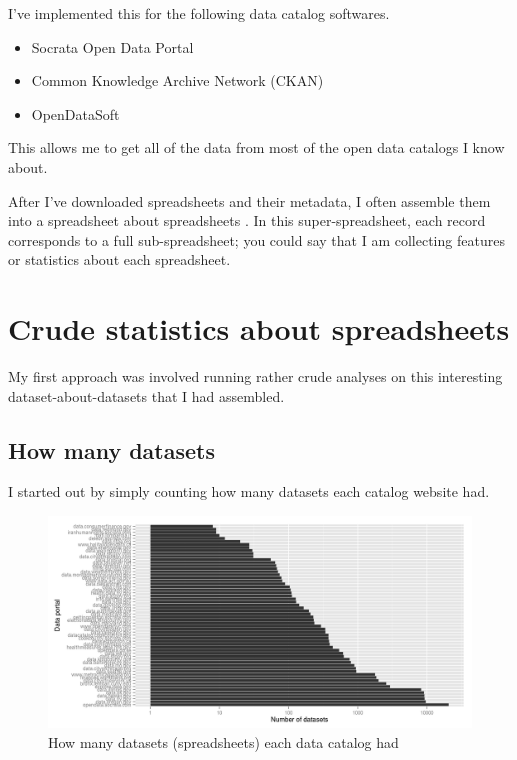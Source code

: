 \documentclass{acm_proc_article-sp}
\begin{document}
I've implemented this for the following data catalog softwares.

\begin{itemize}
\setlength{\itemsep}{0pt}
\item Socrata Open Data Portal
\item Common Knowledge Archive Network (CKAN)
\item OpenDataSoft
\end{itemize}

This allows me to get all of the data from most of the open data catalogs I know about.

After I've downloaded spreadsheets and their metadata,
I often assemble them into a spreadsheet about spreadsheets \cite{data-driven}.
In this super-spreadsheet, each record corresponds to a full
sub-spreadsheet; you could say that I am collecting features or statistics
about each spreadsheet.

\section{Crude statistics about spreadsheets}
My first approach was involved running rather crude analyses on this
interesting dataset-about-datasets that I had assembled.

\subsection{How many datasets}
I started out by simply counting how many datasets each catalog website had.

\begin{figure}
\includegraphics[width=\textwidth]{../socrata-summary/figure/big_portals_datasets.png}
\caption{How many datasets (spreadsheets) each data catalog had}
\centering
\end{figure}
\end{document}
